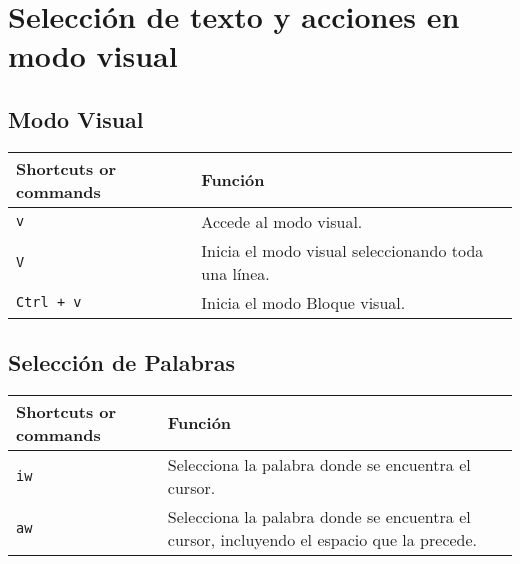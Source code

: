 \documentclass[
  doc,
  floatsintext,
  longtable,
  a4paper,
  nolmodern,
  notxfonts,
  notimes,
  colorlinks=true,linkcolor=blue,citecolor=blue,urlcolor=blue]{apa7}
\begin{document}
\section{Selección de texto y acciones en modo
visual}\label{selecciuxf3n-de-texto-y-acciones-en-modo-visual}

\subsection{Modo Visual}\label{modo-visual}

\begin{longtable}[]{@{}
  >{\raggedright\arraybackslash}p{}
  >{\raggedright\arraybackslash}p{}@{}}
\toprule\noalign{}
\begin{minipage}[b]{\linewidth}\raggedright
Shortcuts or commands
\end{minipage} & \begin{minipage}[b]{\linewidth}\raggedright
Función
\end{minipage} \\
\midrule\noalign{}
\endhead
\bottomrule\noalign{}
\endlastfoot
\texttt{v} & Accede al modo visual. \\
\texttt{V} & Inicia el modo visual seleccionando toda una línea. \\
\texttt{Ctrl\ +\ v} & Inicia el modo Bloque visual. \\
\end{longtable}

\subsection{Selección de Palabras}\label{selecciuxf3n-de-palabras}

\begin{longtable}[]{@{}
  >{\raggedright\arraybackslash}p{}
  >{\raggedright\arraybackslash}p{}@{}}
\toprule\noalign{}
\begin{minipage}[b]{\linewidth}\raggedright
Shortcuts or commands
\end{minipage} & \begin{minipage}[b]{\linewidth}\raggedright
Función
\end{minipage} \\
\midrule\noalign{}
\endhead
\bottomrule\noalign{}
\endlastfoot
\texttt{iw} & Selecciona la palabra donde se encuentra el cursor. \\
\texttt{aw} & Selecciona la palabra donde se encuentra el cursor,
incluyendo el espacio que la precede. \\
\end{longtable}
\end{document}
